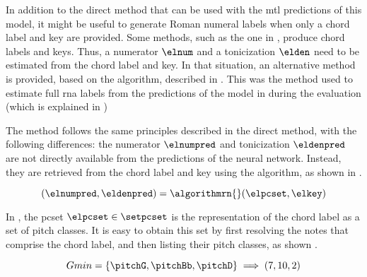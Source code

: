 
In addition to the direct method that can be used with the
\gls{mtl} predictions of this model, it might be useful to
generate Roman numeral labels when only a chord label and
key are provided. Some methods, such as the one in
\textcite{mcleod2021modular}, produce chord labels and keys.
Thus, a numerator $\elnum$ and a tonicization $\elden$ need
to be estimated from the chord label and key. In that
situation, an alternative method is provided, based on the
\algorithmrn{} algorithm, described in
.
This was the method used to estimate full \gls{rna} labels
from the predictions of the model in
\textcite{mcleod2021modular, chen2021attend} during the
evaluation (which is explained in
)

The method follows the same principles described in the
direct method, with the following differences: the numerator
$\elnumpred$ and tonicization $\eldenpred$ are not directly
available from the predictions of the neural network.
Instead, they are retrieved from the chord label and key
using the \algorithmrn{} algorithm, as shown in
.

\begin{equation}
    \label{eq:calling_natem}
    (\elnumpred, \eldenpred) = \algorithmrn{}(\elpcset, \elkey) 
\end{equation}

In , the \gls{pcset} $\elpcset \in
\setpcset$ is the representation of the chord label as a set
of pitch classes. It is easy to obtain this set by first
resolving the notes that comprise the chord label, and then
listing their pitch classes, as shown
.


\begin{equation}
    \label{eq:indirect_method_pcset}
    Gmin = \{\pitchG, \pitchBb, \pitchD\} \implies (7, 10, 2)
\end{equation} 
